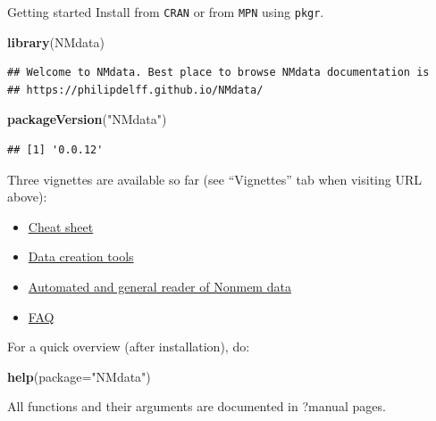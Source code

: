 \documentclass[
  8pt,
  ignorenonframetext,
  aspectratio=169]{beamer}
\newenvironment{Shaded}{\begin{snugshade}}{\end{snugshade}}
\newcommand{\DataTypeTok}[1]{\textcolor[rgb]{0.13,0.29,0.53}{#1}}
\newcommand{\KeywordTok}[1]{\textcolor[rgb]{0.13,0.29,0.53}{\textbf{#1}}}
\newcommand{\NormalTok}[1]{#1}
\newcommand{\StringTok}[1]{\textcolor[rgb]{0.31,0.60,0.02}{#1}}
\providecommand{\tightlist}{%
  \setlength{\itemsep}{0pt}\setlength{\parskip}{0pt}}
\begin{document}
\begin{frame}[fragile]{Getting started}
\protect\hypertarget{getting-started}{}
Install from \texttt{CRAN} or from \texttt{MPN} using \texttt{pkgr}.

\begin{Shaded}
\begin{Highlighting}[]
\KeywordTok{library}\NormalTok{(NMdata)}
\end{Highlighting}
\end{Shaded}

\begin{verbatim}
## Welcome to NMdata. Best place to browse NMdata documentation is
## https://philipdelff.github.io/NMdata/
\end{verbatim}

\begin{Shaded}
\begin{Highlighting}[]
\KeywordTok{packageVersion}\NormalTok{(}\StringTok{"NMdata"}\NormalTok{)}
\end{Highlighting}
\end{Shaded}

\begin{verbatim}
## [1] '0.0.12'
\end{verbatim}

Three vignettes are available so far (see ``Vignettes'' tab when
visiting URL above):

\begin{itemize}
\tightlist
\item
  \href{https://htmlpreview.github.io/?https://github.com/philipdelff/NMdata/blob/master/vignettes/NMdata-cheat.html}{Cheat
  sheet}
\item
  \href{https://philipdelff.github.io/NMdata/articles/DataCreate.html}{Data
  creation tools}
\item
  \href{https://philipdelff.github.io/NMdata/articles/NMscanData.html}{Automated
  and general reader of Nonmem data}
\item
  \href{https://philipdelff.github.io/NMdata/articles/NMdata-FAQ.html}{FAQ}
\end{itemize}

For a quick overview (after installation), do:

\begin{Shaded}
\begin{Highlighting}[]
\KeywordTok{help}\NormalTok{(}\DataTypeTok{package=}\StringTok{"NMdata"}\NormalTok{)}
\end{Highlighting}
\end{Shaded}

All functions and their arguments are documented in ?manual pages.
\end{frame}
\end{document}
